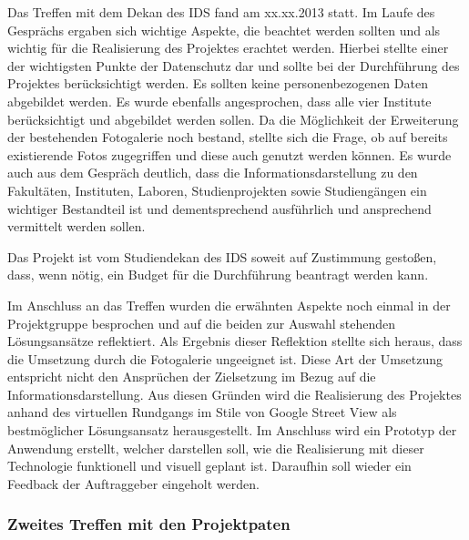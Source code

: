 Das Treffen mit dem Dekan des IDS fand am xx.xx.2013 statt.
Im Laufe des Gesprächs ergaben sich wichtige Aspekte, die beachtet werden sollten und als wichtig für die Realisierung 
des Projektes erachtet werden. Hierbei stellte einer der wichtigsten Punkte der Datenschutz dar und sollte bei der 
Durchführung des Projektes berücksichtigt werden. Es sollten keine personenbezogenen Daten abgebildet werden.
Es wurde ebenfalls angesprochen, dass alle vier Institute berücksichtigt und abgebildet werden sollen. Da die Möglichkeit 
der Erweiterung der bestehenden Fotogalerie noch bestand, stellte sich die Frage, ob auf bereits existierende Fotos 
zugegriffen und diese auch genutzt werden können. 
Es wurde auch aus dem Gespräch deutlich, dass die Informationsdarstellung zu den Fakultäten, Instituten, Laboren, 
Studienprojekten sowie Studiengängen ein wichtiger Bestandteil ist und dementsprechend ausführlich und ansprechend 
vermittelt werden sollen.

Das Projekt ist vom Studiendekan des IDS soweit auf Zustimmung gestoßen, dass, wenn nötig, ein Budget für die 
Durchführung beantragt werden kann.

Im Anschluss an das Treffen wurden die erwähnten Aspekte noch einmal in der Projektgruppe besprochen und auf die beiden 
zur Auswahl stehenden Lösungsansätze reflektiert. Als Ergebnis dieser Reflektion stellte sich heraus, dass die Umsetzung 
durch die Fotogalerie ungeeignet ist. Diese Art der Umsetzung entspricht nicht den Ansprüchen der Zielsetzung im Bezug 
auf die Informationsdarstellung.
Aus diesen Gründen wird die Realisierung des Projektes anhand des virtuellen Rundgangs im Stile von Google Street View 
als bestmöglicher Lösungsansatz herausgestellt. Im Anschluss wird ein Prototyp der Anwendung erstellt, welcher darstellen 
soll, wie die Realisierung mit dieser Technologie funktionell und visuell geplant ist. Daraufhin soll wieder ein Feedback 
der Auftraggeber eingeholt werden.

\subsubsection*{Zweites Treffen mit den Projektpaten}
\label{sec:Treffen3}

